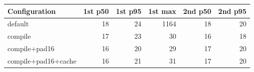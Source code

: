 \begin{tabular}{lrrrrr}
\toprule
Configuration & 1st p50 & 1st p95 & 1st max & 2nd p50 & 2nd p95 \\
\midrule
default & 18 & 24 & 1164 & 18 & 20 \\
compile & 17 & 23 & 30 & 16 & 18 \\
compile+pad16 & 16 & 20 & 29 & 17 & 20 \\
compile+pad16+cache & 16 & 21 & 31 & 17 & 20 \\
\bottomrule
\end{tabular}
